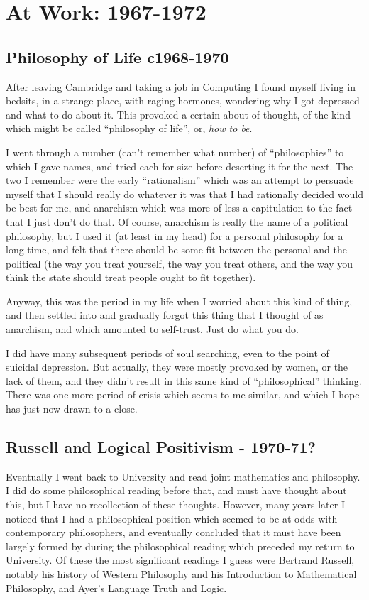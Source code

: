 \chapter{At Work: 1967-1972}

\section{Philosophy of Life c1968-1970}

After leaving Cambridge and taking a job in Computing I found myself living in bedsits, in a strange place, with raging hormones, wondering why I got depressed and what to do about it.
This provoked a certain about of thought, of the kind which might be called ``philosophy of life'', or, {\it how to be}.

I went through a number (can't remember what number) of ``philosophies'' to which I gave names, and tried each for size before deserting it for the next.
The two I remember were the early ``rationalism'' which was an attempt to persuade myself that I should really do whatever it was that I had rationally decided would be best for me, and anarchism which was more of less a capitulation to the fact that I just don't do that.
Of course, anarchism is really the name of a political philosophy, but I used it (at least in my head) for a personal philosophy for a long time, and felt that there should be some fit between the personal and the political (the way you treat yourself, the way you treat others, and the way you think the state should treat people ought to fit together).

Anyway, this was the period in my life when I worried about this kind of thing, and then settled into and gradually forgot this thing that I thought of as anarchism, and which amounted to self-trust.
Just do what you do.

I did have many subsequent periods of soul searching, even to the point of suicidal depression.
But actually, they were mostly provoked by women, or the lack of them, and they didn't result in this same kind of ``philosophical'' thinking.
There was one more period of crisis which seems to me similar, and which I hope has just now drawn to a close.

\section{Russell and Logical Positivism - 1970-71?}

Eventually I went back to University and read joint mathematics and philosophy.
I did do some philosophical reading before that, and must have thought about this, but I have no recollection of these thoughts.
However, many years later I noticed that I had a philosophical position which seemed to be at odds with contemporary philosophers, and eventually concluded that it must have been largely formed by during the philosophical reading which preceded my return to University.
Of these the most significant readings I guess were Bertrand Russell, notably his history of Western Philosophy and his Introduction to Mathematical Philosophy, and Ayer's Language Truth and Logic.

